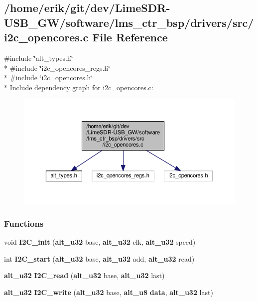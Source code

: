 \subsection{/home/erik/git/dev/\+Lime\+S\+D\+R-\/\+U\+S\+B\+\_\+\+G\+W/software/lms\+\_\+ctr\+\_\+bsp/drivers/src/i2c\+\_\+opencores.c File Reference}
\label{software_2lms__ctr__bsp_2drivers_2src_2i2c__opencores_8c}
{\ttfamily \#include \char`\"{}alt\+\_\+types.\+h\char`\"{}}\\*
{\ttfamily \#include \char`\"{}i2c\+\_\+opencores\+\_\+regs.\+h\char`\"{}}\\*
{\ttfamily \#include \char`\"{}i2c\+\_\+opencores.\+h\char`\"{}}\\*
Include dependency graph for i2c\+\_\+opencores.\+c\+:
\nopagebreak
\begin{figure}[H]
\begin{center}
\leavevmode
\includegraphics[width=350pt]{d2/df6/software_2lms__ctr__bsp_2drivers_2src_2i2c__opencores_8c__incl}
\end{center}
\end{figure}
\subsubsection*{Functions}
\begin{DoxyCompactItemize}
\item 
void {\bf I2\+C\+\_\+init} ({\bf alt\+\_\+u32} base, {\bf alt\+\_\+u32} clk, {\bf alt\+\_\+u32} speed)
\item 
int {\bf I2\+C\+\_\+start} ({\bf alt\+\_\+u32} base, {\bf alt\+\_\+u32} add, {\bf alt\+\_\+u32} read)
\item 
{\bf alt\+\_\+u32} {\bf I2\+C\+\_\+read} ({\bf alt\+\_\+u32} base, {\bf alt\+\_\+u32} last)
\item 
{\bf alt\+\_\+u32} {\bf I2\+C\+\_\+write} ({\bf alt\+\_\+u32} base, {\bf alt\+\_\+u8} {\bf data}, {\bf alt\+\_\+u32} last)
\end{DoxyCompactItemize}


